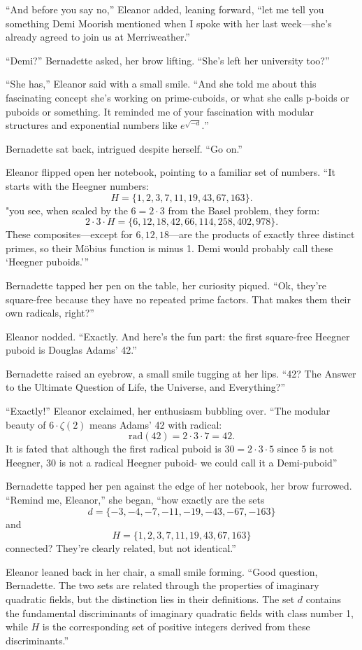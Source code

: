 “And before you say no,” Eleanor added, leaning forward, “let me tell you something Demi Moorish mentioned when I spoke with her last week—she’s already agreed to join us at Merriweather.”

“Demi?” Bernadette asked, her brow lifting. “She’s left her university too?”

“She has,” Eleanor said with a small smile. “And she told me about this fascinating concept she’s working on prime-cuboids, or what she calls p-boids or puboids or something. It reminded me of your fascination with modular structures and exponential numbers like 
\(
e^{\sqrt{-d}}.
\)”

Bernadette sat back, intrigued despite herself. “Go on.”

Eleanor flipped open her notebook, pointing to a familiar set of numbers. “It starts with the Heegner numbers:
\[
H = \{1, 2, 3, 7, 11, 19, 43, 67, 163\}.
\]
"you see, when scaled by the \(6=2 \cdot 3\) from the Basel problem, they form:
\[
2 \cdot 3 \cdot H = \{6, 12, 18, 42, 66, 114, 258, 402, 978\}.
\]
These composites—except for \(6, 12, 18\)—are the products of exactly three distinct primes, so their Möbius function is minus 1. Demi would probably call these ‘Heegner puboids.’”

Bernadette tapped her pen on the table, her curiosity piqued. “Ok, they’re square-free because they have no repeated prime factors. That makes them their own radicals, right?”

Eleanor nodded. “Exactly. And here’s the fun part: the first square-free Heegner puboid is Douglas Adams’ 42.”

Bernadette raised an eyebrow, a small smile tugging at her lips. “42? The Answer to the Ultimate Question of Life, the Universe, and Everything?”

“Exactly!” Eleanor exclaimed, her enthusiasm bubbling over. “The modular beauty of \(6 \cdot \zeta(2)\) means Adams’ 42 with radical:
\[
\mathrm{rad}(42) = 2 \cdot 3 \cdot 7 = 42.
\]
It is fated that although the first radical puboid is \(30=2\cdot3\cdot5\) since \(5\) is not Heegner, \(30\) is not a radical Heegner puboid- we could call it a Demi-puboid”

Bernadette tapped her pen against the edge of her notebook, her brow furrowed. “Remind me, Eleanor,” she began, “how exactly are the sets 
\[
d = \{-3, -4, -7, -11, -19, -43, -67, -163\}
\] 
and 
\[
H = \{1, 2, 3, 7, 11, 19, 43, 67, 163\}
\] 
connected? They’re clearly related, but not identical.”

Eleanor leaned back in her chair, a small smile forming. “Good question, Bernadette. The two sets are related through the properties of imaginary quadratic fields, but the distinction lies in their definitions. The set \(d\) contains the fundamental discriminants of imaginary quadratic fields with class number 1, while \(H\) is the corresponding set of positive integers derived from these discriminants.”

